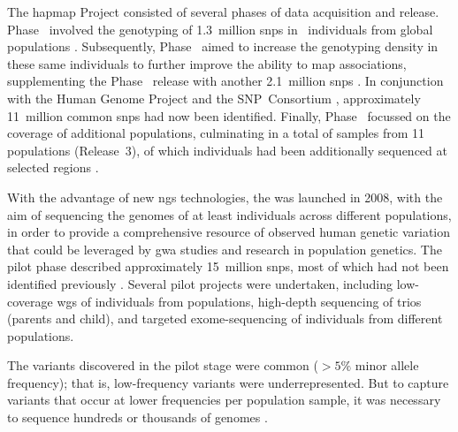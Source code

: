 The \gls{hapmap} Project consisted of several phases of data acquisition and release.
Phase~ involved the genotyping of 1.3~million \glspl{snp} in ~individuals from  global populations \citep{Thorisson:2005ff}.
Subsequently, Phase~ aimed to increase the genotyping density in these same individuals to further improve the ability to map associations, supplementing the Phase~ release with another 2.1~million \glspl{snp} \citep{Frazer:2007kha}.
In conjunction with the Human Genome Project and the SNP~Consortium \citep{McCarroll:2008dy}, approximately 11~million common \glspl{snp} had now been identified.
Finally, Phase~ focussed on the coverage of additional populations, culminating in a total of  samples from 11 populations (Release~3), of which  individuals had been additionally sequenced at selected regions \citep{InternationalHapMapConsortium:2010en}.

With the advantage of new \gls{ngs} technologies, the  was launched in 2008, with the aim of sequencing the genomes of at least  individuals across different populations, in order to provide a comprehensive resource of observed human genetic variation that could be leveraged by \gls{gwa} studies and research in population genetics.
The pilot phase described approximately 15~million \glspl{snp}, most of which had not been identified previously \citep{Durbin:2010gj}.
Several pilot projects were undertaken, including low-coverage \gls{wgs} of  individuals from  populations, high-depth sequencing of  trios (parents and child), and targeted exome-sequencing of  individuals from  different populations.

The variants discovered in the pilot stage were common ($>5\%$ minor allele frequency); that is, low-frequency variants were underrepresented.
But to capture variants that occur at lower frequencies per population sample, it was necessary to sequence hundreds or thousands of genomes \citep{Kaiser:2008wd}.




%

%

